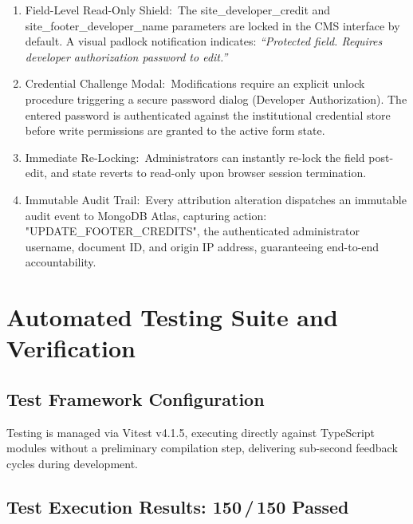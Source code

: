 \documentclass[12pt, a4paper, oneside]{report}
\def\textbf#1{#1}
\def\texttt#1{#1}
\def\&{and}
\begin{document}
\begin{enumerate}
  \item \textbf{Field-Level Read-Only Shield:}\ The \texttt{site\_developer\_credit} and
        \texttt{site\_footer\_developer\_name} parameters are locked in the CMS interface
        by default.  A visual padlock notification indicates: \textit{``Protected field.
        Requires developer authorization password to edit.''}
  \item \textbf{Credential Challenge Modal:}\ Modifications require an explicit unlock
        procedure triggering a secure password dialog (\texttt{Developer Authorization}).
        The entered password is authenticated against the institutional credential store
        before write permissions are granted to the active form state.
  \item \textbf{Immediate Re-Locking:}\ Administrators can instantly re-lock the field
        post-edit, and state reverts to read-only upon browser session termination.
  \item \textbf{Immutable Audit Trail:}\ Every attribution alteration dispatches an
        immutable audit event to MongoDB Atlas, capturing \texttt{action: "UPDATE\_FOOTER\_CREDITS"},
        the authenticated administrator username, document ID, and origin IP address,
        guaranteeing end-to-end accountability.
\end{enumerate}


\chapter{Automated Testing Suite \texorpdfstring{\&}{and} Verification}

\section{Test Framework Configuration}

Testing is managed via \textbf{Vitest v4.1.5}, executing directly against
TypeScript modules without a preliminary compilation step, delivering
sub-second feedback cycles during development.

\section{Test Execution Results: 150\,/\,150 Passed}
\end{document}
